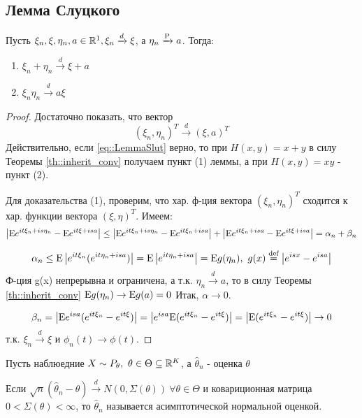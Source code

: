 \subsection{Лемма Слуцкого}
Пусть \(\xi_n, \xi, \eta_n, a \in \R^1, \xi_n \xrightarrow{d} \xi\), а \(\eta_n \xrightarrow{\P} a\).
Тогда:
\begin{enumerate}
    \item \(\xi_n + \eta_n \xrightarrow{d} \xi + a\)
    \item \(\xi_n \eta_n \xrightarrow{d} a\xi\)
\end{enumerate}
\begin{proof}
    Достаточно показать, что вектор
    \begin{equation} \label{eq::LemmaSlut}
        (\xi_n, \eta_n)^T \xrightarrow{d} (\xi, a)^T
    \end{equation}
    Действительно, если \eqref{eq::LemmaSlut} верно, то при \(H(x, y) = x + y\) в силу Теоремы \ref{th::inherit_conv} получаем пункт (1) леммы,
    а при \(H(x, y) = xy\) -  пункт (2).

    Для доказательства (1), проверим, что хар. ф-ция
    вектора \((\xi_n, \eta_n)^T\) сходится к хар. функции вектора \((\xi, \eta)^T\).
    Имеем:
    \[\left\lvert\E e^{it\xi_n + is\eta_n} - \E e^{it\xi + isa}\right\rvert \leq \left\lvert \E e^{it\xi_n + is\eta_n} - \E e^{it\xi_n + isa}\right\rvert + \left\lvert \E e^{it\xi_n + isa} - \E e^{it\xi + isa}\right\rvert = \alpha_n + \beta_n\]

    \[\alpha_n \leq \E \left\lvert e^{it\xi_n}(e^{it\eta_n + isa}) \right\rvert  = \E \left\lvert e^{it\eta_n + isa} \right\rvert  = \E g(\eta_n), \ g(x)\defeq\left\lvert e^{isx} - e^{isa} \right\rvert \]
    Ф-ция g(x) непрерывна и ограничена, а т.к. \(\eta_n \xrightarrow{d} a\),
    то в силу Теоремы \ref{th::inherit_conv} \(\E g(\eta_n) \rightarrow \E g(a) = 0\)
    Итак, \(\alpha \rightarrow 0\).

    \[\beta_n = \left\lvert \E e^{isa}(e^{it\xi_n} - e^{it\xi}) \right\rvert  = \left\lvert e^{isa} \E (e^{it\xi_n} - e^{it\xi}) \right\rvert  = \left\lvert \E (e^{it\xi_n} - e^{it\xi}) \right\rvert  \rightarrow 0\]
    т.к. \(\xi_n \xrightarrow{d} \xi\) и \(\phi_n(t) \rightarrow \phi(t)\).
\end{proof}

Пусть наблюедние \(X \sim  P_{\theta},\ \theta \in \Theta \subseteq \R^{K}\), а \(\widehat{\theta}_n\) - оценка \(\theta\)

\begin{definition}
    Если \(\sqrt{n}(\widehat{\theta}_n - \theta) \xrightarrow{d} N(0, \Sigma(\theta)) \ \forall \theta \in \Theta\)
    и ковариционная матрица \(0 < \Sigma(\theta) < \infty\), то \(\widehat{\theta}_n\) называется асимптотической нормальной оценкой.
\end{definition}

